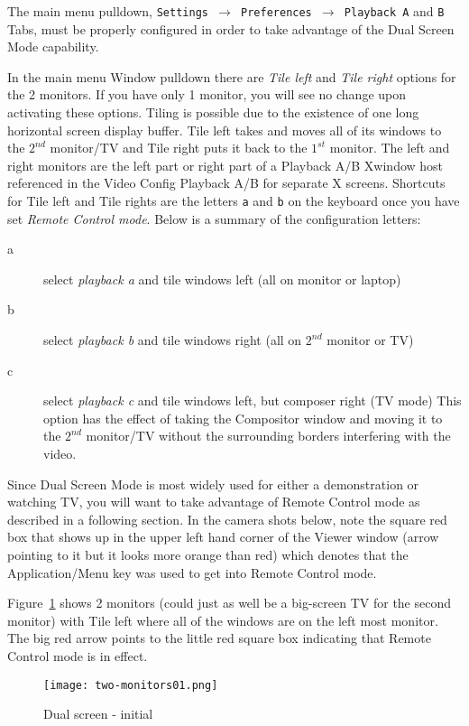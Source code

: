 The main menu pulldown, \texttt{Settings $\rightarrow$ Preferences $\rightarrow$ Playback A} and \texttt{B} Tabs, must be properly configured in order to take advantage of the Dual Screen Mode capability.

In the main menu Window pulldown there are \textit{Tile left} and \textit{Tile right} options for the 2 monitors.  If you have only 1 monitor, you will see no change upon activating these options.  Tiling is possible due to the existence of one long horizontal screen display buffer. Tile left takes \CGG{} and moves all of its windows to the $2^{nd}$ monitor/TV and Tile right puts it back to the $1^{st}$ monitor.  The left and right monitors are the left part or right part of a Playback A/B Xwindow host referenced in the Video Config Playback A/B for separate X screens.  Shortcuts for Tile left and Tile rights are the letters \texttt{a} and \texttt{b} on the keyboard once you have set \textit{Remote Control mode}.  Below is a summary of the configuration letters:

\begin{description}
    \item[a] select \textit{playback a} and tile windows left (all on monitor or laptop)
    \item[b] select \textit{playback b} and tile windows right (all on $2^{nd}$ monitor or TV)
    \item[c] select \textit{playback c} and tile windows left, but composer right (TV mode) This option has the effect of taking the Compositor window and moving it to the $2^{nd}$ monitor/TV without the surrounding borders interfering with the video.
\end{description}

Since Dual Screen Mode is most widely used for either a demonstration or watching TV, you will want to take advantage of Remote Control mode as described in a following section.  In the camera shots below, note the square red box that shows up in the upper left hand corner of the Viewer window (arrow pointing to it but it looks more orange than red) which denotes that the Application/Menu key was used to get into Remote Control mode.

Figure~\ref{fig:two-monitors01} shows 2 monitors (could just as well be a big-screen TV for the second monitor) with Tile left where all of the \CGG{} windows are on the left most monitor.  The big red arrow points to the little red square box indicating that Remote Control mode is in effect.

\begin{figure}[htpb]
    \centering
    \texttt{[image: two-monitors01.png]}
    \caption{Dual screen - initial}
    \label{fig:two-monitors01}
\end{figure}

